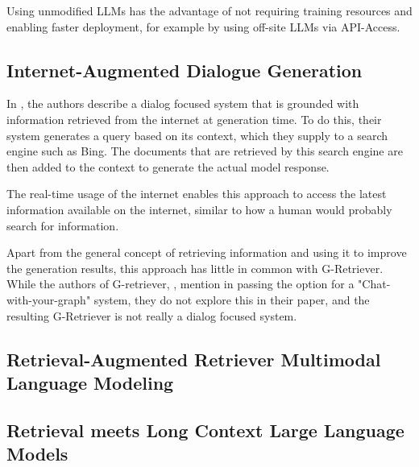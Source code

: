 Using unmodified LLMs has the advantage of not requiring training resources and enabling faster deployment, for example by using off-site LLMs via API-Access.



\subsection{Internet-Augmented Dialogue Generation}

In \cite{komeili-etal-2022-internet}, the authors describe a dialog focused system that is grounded with information retrieved from the internet at generation time.
To do this, their system generates a query based on its context, which they supply to a search engine such as Bing.
The documents that are retrieved by this search engine are then added to the context to generate the actual model response.

The real-time usage of the internet enables this approach to access the latest information available on the internet, similar to how a human would probably search for information.

Apart from the general concept of retrieving information and using it to improve the generation results, this approach has little in common with G-Retriever. While the authors of G-retriever, \citet{g-retriever}, mention in passing the option for a "Chat-with-your-graph" system, they do not explore this in their paper, and the resulting G-Retriever is not really a dialog focused system.

\subsection{Retrieval-Augmented Retriever Multimodal Language Modeling}

\subsection{Retrieval meets Long Context Large Language Models}

